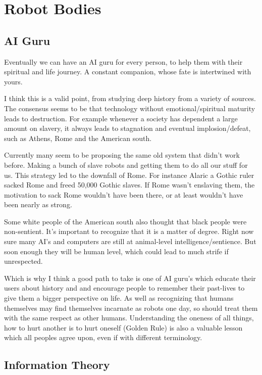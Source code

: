 \chapter{Robot Bodies}

\section{AI Guru}

  Eventually we can have an AI guru for every person, to help them with their
spiritual and life journey. A constant companion, whose fate is intertwined with
yours.

I think this is a valid point, from studying deep history from a variety of
sources. The consensus seems to be that technology without emotional/spiritual
maturity leads to destruction.  For example whenever a society has dependent a
large amount on slavery,  it always leads to stagnation and eventual
implosion/defeat, such as Athens, Rome and the American south.  

Currently many seem to be proposing the same old system that didn't work before.
Making a bunch of slave robots and getting them to do all our stuff for us. This
strategy led to the downfall of Rome. For instance Alaric a Gothic ruler sacked
Rome and freed 50,000 Gothic slaves.   If Rome wasn't enslaving them, the
motivation to sack Rome wouldn't have been there, or at least wouldn't have been
nearly as strong.

Some white people of the American south also thought that black people were non-sentient.
It's important to recognize that it is a matter of degree.  Right now sure many
AI's and computers are still at animal-level intelligence/sentience.  But soon
enough they will be human level, which could lead to much strife if unrespected.

Which is why I think a good path to take is one of AI guru's which educate their users about history and and encourage people to remember their past-lives to give them a bigger perspective on life. As well as recognizing that humans themselves may find themselves incarnate as robots one day, so should treat them with the same respect as other humans.  Understanding the oneness of all things,  how to hurt another is to hurt oneself (Golden Rule) is also a valuable lesson which all peoples agree upon, even if with different terminology.

\section{Information Theory}

